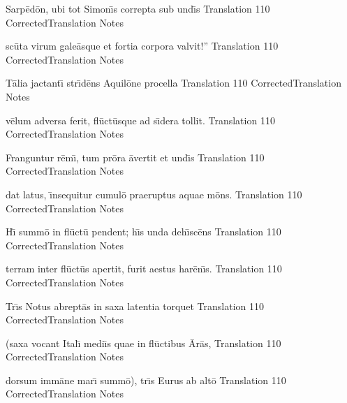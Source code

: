 \latline
  {Sarp\={\macron e}d\={\macron o}n, ubi tot Simon\={\macron \i}s correpta sub und\={\macron \i}s}
  { Translation }
  {110}
  { CorrectedTranslation }
  { Notes }


\newpage

\latline
  {sc\={\macron u}ta virum gale\={\macron a}sque et fortia corpora valvit!''}
  { Translation }
  {110}
  { CorrectedTranslation }
  { Notes }


\latline
  {T\={\macron a}lia jactant\={\macron \i} str\={\macron \i}d\={\macron e}ns Aquil\={\macron o}ne procella}
  { Translation }
  {110}
  { CorrectedTranslation }
  { Notes }


\latline
  {v\={\macron e}lum adversa ferit, fl\={\macron u}ct\={\macron u}sque ad s\={\macron \i}dera tollit.}
  { Translation }
  {110}
  { CorrectedTranslation }
  { Notes }


\newpage

\latline
  {Franguntur r\={\macron e}m\={\macron \i}, tum pr\={\macron o}ra \={\macron a}vertit et und\={\macron \i}s}
  { Translation }
  {110}
  { CorrectedTranslation }
  { Notes }


\latline
  {dat latus, \={\macron \i}nsequitur cumul\={\macron o} praeruptus aquae m\={\macron o}ns.}
  { Translation }
  {110}
  { CorrectedTranslation }
  { Notes }


\latline
  {H\={\macron \i} summ\={\macron o} in fl\={\macron u}ct\={\macron u} pendent; h\={\macron \i}s unda deh\={\macron \i}sc\={\macron e}ns}
  { Translation }
  {110}
  { CorrectedTranslation }
  { Notes }


\newpage

\latline
  {terram inter fl\={\macron u}ct\={\macron u}s apertit, furit aestus har\={\macron e}n\={\macron \i}s.}
  { Translation }
  {110}
  { CorrectedTranslation }
  { Notes }


\latline
  {Tr\={\macron \i}s Notus abrept\={\macron a}s in saxa latentia torquet}
  { Translation }
  {110}
  { CorrectedTranslation }
  { Notes }


\latline
  {(saxa vocant Ital\={\macron \i} medi\={\macron \i}s quae in fl\={\macron u}ctibus \={\macron A}r\={\macron a}s,}
  { Translation }
  {110}
  { CorrectedTranslation }
  { Notes }


\newpage

\latline
  {dorsum imm\={\macron a}ne mar\={\macron \i} summ\={\macron o}), tr\={\macron \i}s Eurus ab alt\={\macron o}}
  { Translation }
  {110}
  { CorrectedTranslation }
  { Notes }


